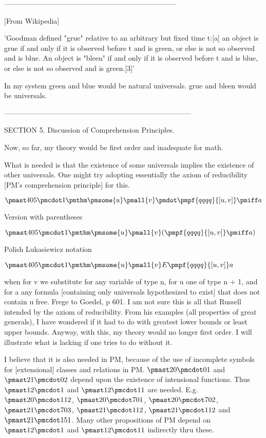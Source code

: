 \documentclass[12pt]{article}
\begin{document}
------------------------------------------------------------------------

[From Wikipedia]

'Goodman defined "grue" relative to an arbitrary but fixed time t:[a] an object is grue if and only if it is observed before t and is green, or else is not so observed and is blue. An object is "bleen" if and only if it is observed before t and is blue, or else is not so observed and is green.[3]'

In my system green and blue would be natural universals. grue and bleen would be universals.

------------------------------------------------------------------------------

SECTION 5. Discussion of Comprehension Principles.

Now, so far, my theory would be first order and inadequate for math.

What is needed is that the existence of some universals implies the existence of other universals. One might try adopting essentially the axiom of reducibility [PM's comprehension principle] for this.

$\pmast 405 \pmcdot 1 \pmthm \pmsome{u} \pmall{v} \pmdot \pmpf{qqqq}{[u,v]} \pmiff a$
 
 

Version with parentheses

$\pmast 405 \pmcdot 1 \pmthm \pmsome{u} \pmall{v}  (  \pmpf{qqqq}{[u,v]} \pmiff a)$


Polish Lukasiewicz notation

$\pmast 405 \pmcdot 1 \pmthm \pmsome{u}   \pmall{v}     E   \pmpf{qqqq}{[u,v]}   a $


when for v we substitute for any variable of type n, for u one of type n + 1, and for a any formula [containing only universals hypothesized to exist] that does not contain u free. Frege to Goedel, p 601. I am not sure this is all that Russell intended by the axiom of reducibility. From his examples (all properties of great generals), I have wondered if it had to do with  greatest lower bounds or least upper bounds. Anyway, with this, my theory would no longer first order. I will illustrate what is lacking if one tries to do without it.

I believe that it is also needed in PM, because of the use of incomplete symbols for [extensional] classes and relations in PM. $\pmast 20 \pmcdot 01$ and $\pmast 21 \pmcdot 02$ depend upon the existence of intensional functions. Thus $\pmast 12 \pmcdot 1$ and $\pmast 12 \pmcdot 11$ are needed. E.g. $\pmast 20 \pmcdot 112$,
$\pmast 20 \pmcdot 701$, $\pmast 20 \pmcdot 702$, $\pmast 21 \pmcdot 703$,
$\pmast 21 \pmcdot 112$, $\pmast 21 \pmcdot 112$ and $\pmast 21 \pmcdot 151$.
Many other propositions of PM depend on $\pmast 12 \pmcdot 1$ and
$\pmast 12 \pmcdot 11$ indirectly thru these.
\end{document}
